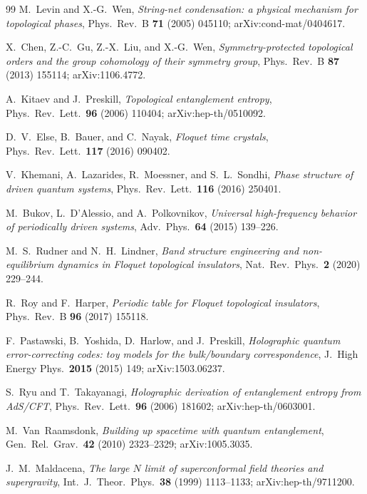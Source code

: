 \documentclass[12pt]{article}
\theoremstyle{definition}
\theoremstyle{remark}
\begin{document}
\begin{thebibliography}{99}
M.~Levin and X.-G.~Wen,
\emph{String-net condensation: a physical mechanism for topological
  phases},
Phys.\ Rev.\ B \textbf{71} (2005) 045110; arXiv:cond-mat/0404617.

X.~Chen, Z.-C.~Gu, Z.-X.~Liu, and X.-G.~Wen,
\emph{Symmetry-protected topological orders and the group cohomology of
  their symmetry group},
Phys.\ Rev.\ B \textbf{87} (2013) 155114; arXiv:1106.4772.

A.~Kitaev and J.~Preskill,
\emph{Topological entanglement entropy},
Phys.\ Rev.\ Lett.\ \textbf{96} (2006) 110404; arXiv:hep-th/0510092.

D.~V.~Else, B.~Bauer, and C.~Nayak,
\emph{Floquet time crystals},
Phys.\ Rev.\ Lett.\ \textbf{117} (2016) 090402.

V.~Khemani, A.~Lazarides, R.~Moessner, and S.~L.~Sondhi,
\emph{Phase structure of driven quantum systems},
Phys.\ Rev.\ Lett.\ \textbf{116} (2016) 250401.

M.~Bukov, L.~D'Alessio, and A.~Polkovnikov,
\emph{Universal high-frequency behavior of periodically driven
  systems},
Adv.\ Phys.\ \textbf{64} (2015) 139--226.

M.~S.~Rudner and N.~H.~Lindner,
\emph{Band structure engineering and non-equilibrium dynamics in
  Floquet topological insulators},
Nat.\ Rev.\ Phys.\ \textbf{2} (2020) 229--244.

R.~Roy and F.~Harper,
\emph{Periodic table for Floquet topological insulators},
Phys.\ Rev.\ B \textbf{96} (2017) 155118.

F.~Pastawski, B.~Yoshida, D.~Harlow, and J.~Preskill,
\emph{Holographic quantum error-correcting codes: toy models for the
  bulk/boundary correspondence},
J.\ High Energy Phys.\ \textbf{2015} (2015) 149; arXiv:1503.06237.

S.~Ryu and T.~Takayanagi,
\emph{Holographic derivation of entanglement entropy from AdS/CFT},
Phys.\ Rev.\ Lett.\ \textbf{96} (2006) 181602; arXiv:hep-th/0603001.

M.~Van~Raamsdonk,
\emph{Building up spacetime with quantum entanglement},
Gen.\ Rel.\ Grav.\ \textbf{42} (2010) 2323--2329; arXiv:1005.3035.

J.~M.~Maldacena,
\emph{The large $N$ limit of superconformal field theories and
  supergravity},
Int.\ J.\ Theor.\ Phys.\ \textbf{38} (1999) 1113--1133;
arXiv:hep-th/9711200.


\end{thebibliography}
\end{document}
